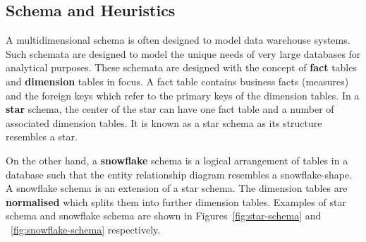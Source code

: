 \subsection{Schema and Heuristics}
A multidimensional schema is often designed to model data warehouse systems. Such schemata are designed to model the unique needs of very large databases for analytical purposes. These schemata are designed with the concept of \textbf{fact} tables and \textbf{dimension} tables in focus. A fact table contains business facts (measures) and the foreign keys which refer to the primary keys of the dimension tables. In a \textbf{star} schema, the center of the star can have one fact table and a number of associated dimension tables. It is known as a star schema as its structure resembles a star.

On the other hand, a \textbf{snowflake} schema is a logical arrangement of tables in a database such that the entity relationship diagram resembles a snowflake-shape. A snowflake schema is an extension of a star schema. The dimension tables are \textbf{normalised} which splits them into further dimension tables. Examples of star schema and snowflake schema are shown in Figures~\ref{fig:star-schema} and ~\ref{fig:snowflake-schema} respectively.

